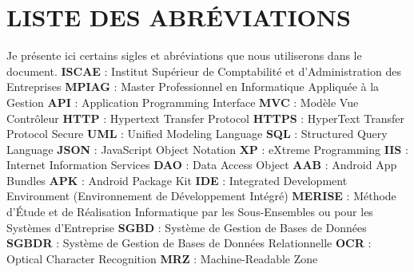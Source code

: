 \documentclass[a4paper, 12pt]{report}
\begin{document}
	\chapter*{LISTE DES ABRÉVIATIONS} \label{chap:1SIGLES ET ABREVIATIONS}
	Je présente ici certains sigles et abréviations que nous utiliserons dans le document.
	\newline\newline
	\textbf{ISCAE} : Institut Supérieur de Comptabilité et d’Administration des Entreprises \newline
	\textbf{MPIAG} : Master Professionnel en Informatique Appliquée à la Gestion \newline
	\textbf{API} : Application Programming Interface \newline
	\textbf{MVC} : Modèle Vue Contrôleur \newline
	\textbf{HTTP} : Hypertext Transfer Protocol \newline
	\textbf{HTTPS} : HyperText Transfer Protocol Secure \newline
	\textbf{UML} : Unified Modeling Language \newline
	\textbf{SQL} : Structured Query Language \newline
	\textbf{JSON} : JavaScript Object Notation \newline
	\textbf{XP} : eXtreme Programming \newline
	\textbf{IIS} : Internet Information Services \newline
	\textbf{DAO} : Data Access Object \newline
	\textbf{AAB} : Android App Bundles \newline
	\textbf{APK} : Android Package Kit \newline
	\textbf{IDE} : Integrated Development Environment (Environnement de Développement Intégré) \newline
	\textbf{MERISE} : Méthode d’Étude et de Réalisation Informatique par les Sous-Ensembles ou pour les Systèmes d’Entreprise \newline
	\textbf{SGBD} : Système de Gestion de Bases de Données \newline
	\textbf{SGBDR} : Système de Gestion de Bases de Données Relationnelle \newline
	\textbf{OCR} : Optical Character Recognition  \newline
	\textbf{MRZ} : Machine-Readable Zone   \newline
	 \newline  
	\thispagestyle{empty}
	
\end{document}
